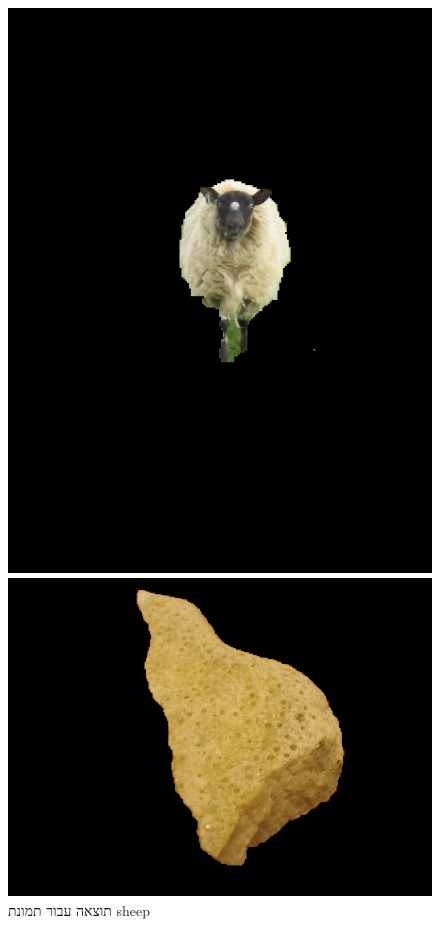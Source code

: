 \documentclass[a4paper,12pt]{article}
\begin{document}
\begin{figure}[H]
    \centering
    \begin{minipage}{0.3\textwidth}
        \centering
        \includegraphics[width=\textwidth]{my_reasults/final_img/sheep_result.png}
        \caption{תוצאה עבור תמונת sheep}
    \end{minipage}
    \hfill
    \begin{minipage}{0.3\textwidth}
        \centering
        \includegraphics[width=\textwidth]{my_reasults/final_img/stone2_result.png}

\end{minipage}
\end{figure}
\end{document}
